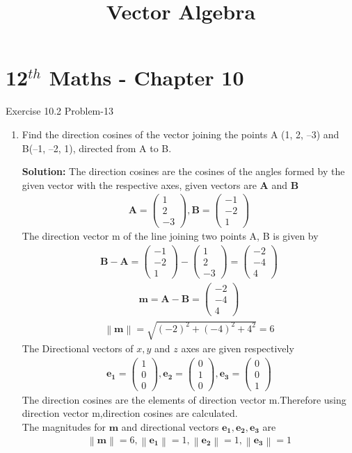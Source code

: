 \documentclass[12pt]{article}
\providecommand{\norm}[1]{\left\lVert#1\right\rVert}
\newcommand{\solution}{\noindent \textbf{Solution: }}
\newcommand{\myvec}[1]{\ensuremath{\begin{pmatrix}#1\end{pmatrix}}}
\let\vec\mathbf
\begin{document}
\begin{center}
\enlargethispage{-4cm}
\title{\textbf{Vector Algebra}}
\date{\vspace{-5ex}} %
\maketitle
\end{center}
\setcounter{page}{1}
\section*{12$^{th}$ Maths - Chapter 10}
 Exercise 10.2 Problem-13
\begin{enumerate}
\item Find the direction cosines of the vector joining the points A (1, 2, –3) and
B(–1, –2, 1), directed from A to B.

\solution The direction cosines are the cosines of the angles formed by the given vector with the respective axes, given vectors are $\vec{A}$ and $\vec{B}$
\begin{align}
	\vec{A} =\myvec{1\\2\\-3} , \vec{B}=\myvec{-1\\-2\\1}
\end{align}
The direction vector m of the line joining two points A, B is given by
\begin{align}
	\vec{B-A} = \myvec{-1\\-2\\1}-\myvec{1\\2\\-3}=\myvec{-2\\-4\\4}
\end{align}
\begin{align}
	\vec{m}=\vec{A-B}=\myvec{-2\\-4\\4}
\end{align}
\begin{align}
	\norm{\vec{m}}=\sqrt{(-2)^2+(-4)^2+4^2}=6
\end{align}
The Directional vectors of $x,y$ and $z$ axes are given respectively 
\begin{align}
   \vec{e_1} =\myvec{1\\0\\0},\vec{e_2}=\myvec{0\\1\\0},\vec{e_3} =\myvec{0\\0\\1}
\end{align}
The direction cosines are the elements of direction vector m.Therefore using direction vector m,direction cosines are calculated.\\
The magnitudes for $\vec{m}$ and directional vectors $\vec{e_1},\vec{e_2},\vec{e_3}$ are
\begin{align}
\norm{\vec{m}}=6,\norm{\vec{e_1}}={1},\norm{\vec{e_2}}={1},\norm{\vec{e_3}}={1}
\end{align}



\end{enumerate}
\end{document}
